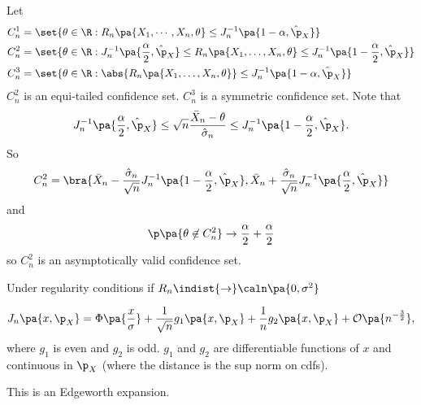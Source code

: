   Let \begin{equation}
  \begin{split}
  C^1_n &= \set{\theta \in \R : R_n\pa{X_1,\cdots,X_n,\theta}\leq J_n^{-1}\pa{1-\alpha,\hat{\p}_X}}\\
  C_n^2 &= \set{\theta \in \R : J_n^{-1}\pa{\frac{\alpha}{2}, \hat{\p}_X}\leq R_n\pa{X_1,\ldots,X_n,\theta}\leq J_n^{-1} \pa{1-\frac{\alpha}{2},\hat{\p}_X}}\\
  C_n^3 &= \set{\theta \in \R : \abs{R_n\pa{X_1,\ldots,X_n,\theta} }\leq J_n^{-1}\pa{1-\alpha,\hat{\p}_X}}
  \end{split}
  \end{equation}
  $C_n^2$ is an equi-tailed confidence set. $C_n^3$ is a symmetric confidence set. Note that
  \begin{equation}
    J_n^{-1}\pa{\frac{\alpha}{2},\hat{\p}_X}\leq \sqrt{n}\frac{\bar{X}_n-\theta}{\hat{\sigma}_n}\leq  J_n^{-1}\pa{1-\frac{\alpha}{2},\hat{\p}_X}.
  \end{equation}
  So
  \begin{equation}
  C_n^2 = \bra{ \bar{X}_n - \frac{\hat{\sigma}_n}{\sqrt{n}} J_n^{-1}\pa{1-\frac{\alpha}{2}, \hat{\p}_X}, \bar{X}_n + \frac{\hat{\sigma}_n}{\sqrt{n}}J_n^{-1} \pa{\frac{\alpha}{2},\hat{\p}_X} }
  \end{equation} and
  \begin{equation}
    \p\pa{\theta \not\in C_n^2} \rightarrow \frac{\alpha}{2} + \frac{\alpha}{2}
  \end{equation} so $C^2_n$ is an asymptotically valid confidence set.
  \begin{theorem}
    Under regularity conditions if $R_n \indist{\rightarrow} \caln\pa{0,\sigma^2}$

    \begin{equation}
    J_n\pa{x,\p_X} = \Phi\pa{\frac{x}{\sigma}} + \frac{1}{\sqrt{n}}g_1\pa{x,\p_X} + \frac{1}{n}g_2\pa{x,\p_X} + \mathcal{O}\pa{n^{-\frac{3}{2}}},
    \end{equation}
    where $g_1$ is even and $g_2$ is odd. $g_1$ and $g_2$ are differentiable functions of $x$ and continuous in $\p_X$ (where the distance is the sup norm on cdfs).

    This is an Edgeworth expansion.
  \end{theorem}
